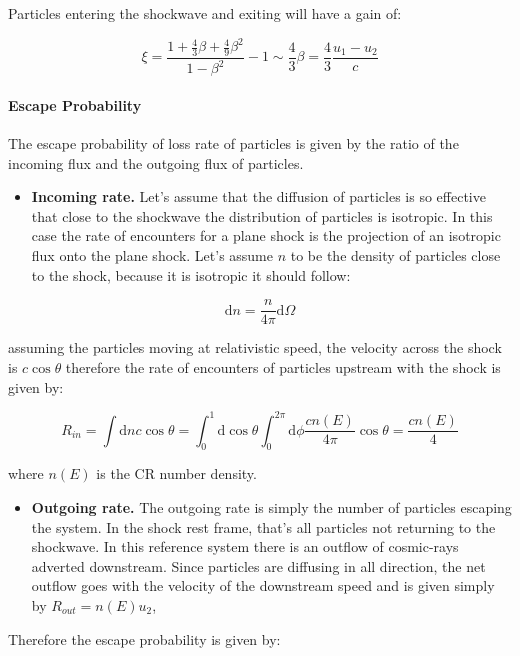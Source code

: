\documentclass[
  letterpaper,
  DIV=11,
  numbers=noendperiod]{scrreprt}
\let\oldparagraph\paragraph
\renewcommand{\paragraph}[1]{\oldparagraph{#1}\mbox{}}
\providecommand{\tightlist}{%
  \setlength{\itemsep}{0pt}\setlength{\parskip}{0pt}}\usepackage{longtable,booktabs,array}
\begin{document}
Particles entering the shockwave and exiting will have a gain of:

\[\xi = \frac{1 + \frac{4}{3}\beta + \frac{4}{9}\beta^2}{1 -\beta^2} - 1 \sim \frac{4}{3}\beta = \frac{4}{3}\frac{u_1 - u_2}{c}\]

\paragraph{Escape Probability}\label{escape-probability}

The escape probability of loss rate of particles is given by the ratio
of the incoming flux and the outgoing flux of particles.

\begin{itemize}
\tightlist
\item
  \textbf{Incoming rate.} Let's assume that the diffusion of particles
  is so effective that close to the shockwave the distribution of
  particles is isotropic. In this case the rate of encounters for a
  plane shock is the projection of an isotropic flux onto the plane
  shock. Let's assume \(n\) to be the density of particles close to the
  shock, because it is isotropic it should follow:
\end{itemize}

\[\mathrm{ d}n = \frac{n}{4\pi}\mathrm{ d}\Omega\]

assuming the particles moving at relativistic speed, the velocity across
the shock is \(c\cos\theta\) therefore the rate of encounters of
particles upstream with the shock is given by:

\[R_{in} = \int \mathrm{ d} n c \cos\theta = \int_0^1 \mathrm{ d} \cos \theta \int_0^{2\pi} \mathrm{ d} \phi\frac{cn(E)}{4\pi}\cos\theta = \frac{cn(E)}{4}\]

where \(n(E)\) is the CR number density.

\begin{itemize}
\tightlist
\item
  \textbf{Outgoing rate.} The outgoing rate is simply the number of
  particles escaping the system. In the shock rest frame, that's all
  particles not returning to the shockwave. In this reference system
  there is an outflow of cosmic-rays adverted downstream. Since
  particles are diffusing in all direction, the net outflow goes with
  the velocity of the downstream speed and is given simply by
  \(R_{out} = n(E) u_2\),
\end{itemize}

Therefore the escape probability is given by:
\end{document}
